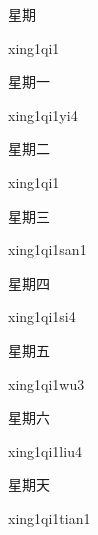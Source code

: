 \begin{multicols*}{2}
\begin{verbete}[xing1qi1]{星期}
\begin{pronuncia}{xing1qi1}
\end{pronuncia}
\end{verbete}

\begin{verbete}[xing1qi1yi4]{星期一}
\begin{pronuncia}{xing1qi1yi4}
\end{pronuncia}
\end{verbete}

\begin{verbete}[xing1qi1]{星期二}
\begin{pronuncia}{xing1qi1}
\end{pronuncia}
\end{verbete}

\begin{verbete}{星期三}
\begin{pronuncia}{xing1qi1san1}
\end{pronuncia}
\end{verbete}

\begin{verbete}[xing1qi1si4]{星期四}
\begin{pronuncia}{xing1qi1si4}
\end{pronuncia}
\end{verbete}

\begin{verbete}[xing1qi1wu3]{星期五}
\begin{pronuncia}{xing1qi1wu3}
\end{pronuncia}
\end{verbete}

\begin{verbete}{星期六}
\begin{pronuncia}{xing1qi1liu4}
\end{pronuncia}
\end{verbete}

\begin{verbete}{星期天}
\begin{pronuncia}{xing1qi1tian1}
\end{pronuncia}
\end{verbete}


\end{multicols*}
